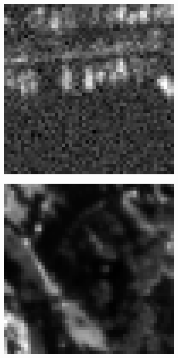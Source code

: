 \begin{figure}[htpb]
\begin{subfigure}{.2\textwidth}
\end{subfigure}%
\begin{subfigure}{.2\textwidth}
\includegraphics[width=\textwidth]{img/image2NoiseLevel5}
\end{subfigure}
\quad
\begin{subfigure}{.2\textwidth}
\includegraphics[width=\textwidth]{img/imageNoiseLevel1}

\end{subfigure}
\end{figure}

